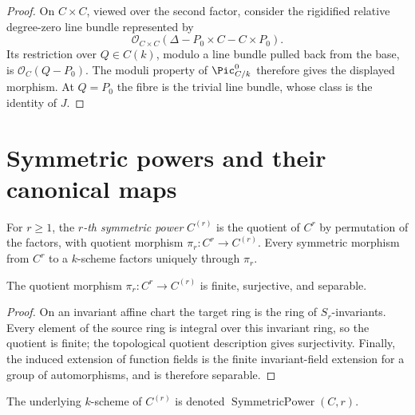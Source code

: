 \begin{proof}
  On \(C\times C\), viewed over the second factor, consider the
  rigidified relative degree-zero line bundle represented by
  \[
    \mathcal O_{C\times C}
      (\Delta-P_0\times C-C\times P_0).
  \]
  Its restriction over \(Q\in C(k)\), modulo a line bundle pulled back
  from the base, is \(\mathcal O_C(Q-P_0)\).  The moduli property of
  \(\Pic^0_{C/k}\) therefore gives the displayed morphism.  At \(Q=P_0\)
  the fibre is the trivial line bundle, whose class is the identity of
  \(J\).
\end{proof}

\section{Symmetric powers and their canonical maps}
\label{sec:albaneseup_symmetric_powers}

\begin{definition}
  \label{def:symmetric_power_curve}

  For \(r\ge 1\), the \emph{\(r\)-th symmetric power} \(C^{(r)}\) is the
  quotient of \(C^r\) by permutation of the factors, with quotient morphism
  \(\pi_r\colon C^r\to C^{(r)}\).  Every symmetric morphism from \(C^r\) to a
  \(k\)-scheme factors uniquely through \(\pi_r\).
\end{definition}

\begin{lemma}
  \label{lem:symmetric_power_projection_properties}

  The quotient morphism \(\pi_r\colon C^r\to C^{(r)}\) is finite,
  surjective, and separable.
\end{lemma}

\begin{proof}
  On an invariant affine chart the target ring is the ring of
  \(S_r\)-invariants.  Every element of the source ring is integral over this
  invariant ring, so the quotient is finite; the topological quotient
  description gives surjectivity.  Finally, the induced extension of
  function fields is the finite invariant-field extension for a group of
  automorphisms, and is therefore separable.
\end{proof}

\begin{definition}
  \label{def:symmetric_power_curve_carrier}

  The underlying \(k\)-scheme of \(C^{(r)}\) is denoted
  \(\operatorname{SymmetricPower}(C,r)\).
\end{definition}

